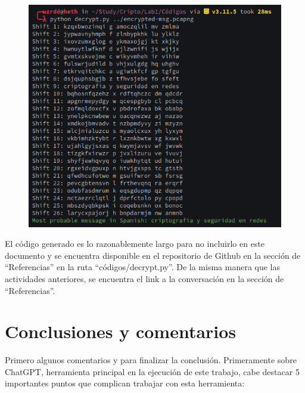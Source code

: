 \documentclass[letter,12pt]{article}
\begin{document}
    \begin{figure}[H]
        \centering
        \includegraphics[width=16cm]{images/03-decrypted.png}
    \end{figure}

El código generado es lo razonablemente largo para no incluirlo en este documento y se encuentra disponible en el repositorio de Github en la sección de ``Referencias'' en la ruta ``códigos/decrypt.py''. De la misma manera que las actividades anteriores, se encuentra el link a la conversación en la sección de ``Referencias''.

\section*{Conclusiones y comentarios}
Primero algunos comentarios y para finalizar la conclusión. Primeramente sobre ChatGPT, herramienta principal en la ejecución de este trabajo, cabe destacar 5 importantes puntos que complican trabajar con esta herramienta:
\end{document}
